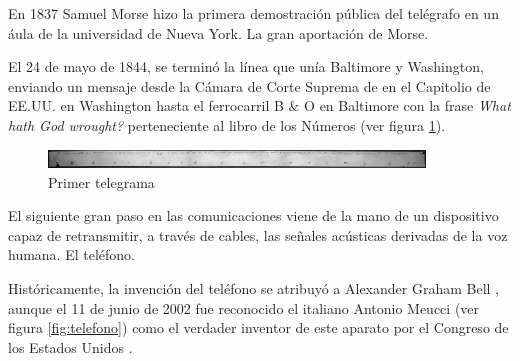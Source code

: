 En 1837 Samuel Morse hizo la primera demostración pública del telégrafo en un áula de la universidad de Nueva York. La gran aportación de Morse.

El 24 de mayo de 1844, se terminó la línea que unía Baltimore y Washington, enviando un mensaje desde la Cámara de Corte Suprema de en el Capitolio de \ac{EE.UU.} en Washington hasta el ferrocarril B \& O en Baltimore con la frase \textit{What hath God wrought?} perteneciente al libro de los Números (ver figura \ref{fig:telegrama}).

\begin{figure}[h!btp]
\centering
\includegraphics[width=100mm, fbox={\fboxrule} 4mm]{images/03-antecedentes/19-primer_telegrama.jpg}
\caption{Primer telegrama}
\label{fig:telegrama}
\end{figure}

El siguiente gran paso en las comunicaciones viene de la mano de un dispositivo capaz de retransmitir, a través de cables, las señales acústicas derivadas de la voz humana. El teléfono.

Históricamente, la invención del teléfono se atribuyó a Alexander Graham Bell \cite{Cab79}, aunque el 11 de junio de 2002 fue reconocido el italiano Antonio Meucci (ver figura \ref{fig:telefono}) como el verdader inventor de este aparato por el Congreso de los Estados Unidos \cite{Uni03}.

